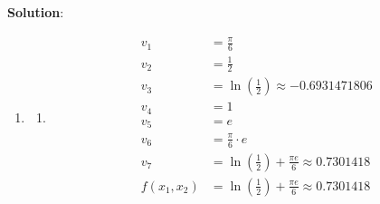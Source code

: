 \documentclass[submit]{../harvardml}
\newenvironment{answer}{
    \vspace{2mm}
    \color{blue}\noindent\textbf{Solution}:
}{}
\begin{document}
\begin{answer}
\begin{enumerate}
    \item

          \begin{enumerate}
            \item
                  \begin{align*}
                    v_1        & = \frac{\pi}{6}\\
                    v_2        & = \frac{1}{2}\\
                    v_3        & = \ln\left(\frac{1}{2}\right) \approx -0.6931471806\\
                    v_4        & = 1\\
                    v_5        & = e\\
                    v_6        & = \frac{\pi}{6}\cdot e\\
                    v_7        & = \ln\left(\frac{1}{2}\right) + \frac{\pi e}{6} \approx 0.7301418\\
                    f(x_1,x_2) & = \ln\left(\frac{1}{2}\right) + \frac{\pi e}{6}  \approx 0.7301418\\
                  \end{align*}


\end{enumerate}
\end{enumerate}
\end{answer}
\end{document}
